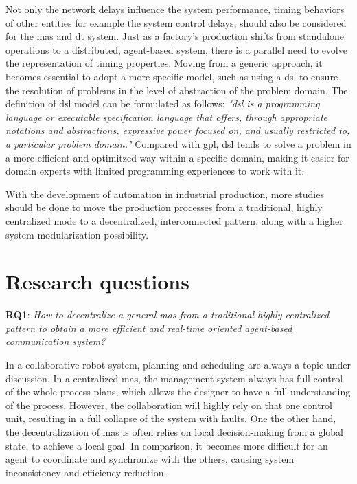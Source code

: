 Not only the network delays influence the system performance, timing behaviors of other 
entities for example the system control delays, should also be considered for the \gls{mas} and 
\gls{dt} system.
Just as a factory's production shifts from standalone operations to a distributed, 
agent-based system, there is a parallel need to evolve the representation of timing 
properties. Moving from a generic approach, it becomes essential to adopt a more 
specific model, such as using a \gls{dsl} to ensure the resolution of problems 
in the level of abstraction of the problem domain. The definition of \gls{dsl} model 
can be formulated as follows: \textit{"\gls{dsl} is a programming language or executable 
specification language
that offers, through appropriate notations and abstractions, expressive power focused 
on, and usually restricted to, a particular problem domain."}\cite{van_deursen_domain-specific_2000}
Compared with \gls{gpl}, \gls{dsl} tends to solve a problem in a more efficient 
and optimitzed way within a specific domain, making it easier for domain experts 
with limited programming experiences to work with it.  

With the development of automation in industrial production, more studies 
should be done to move the production processes from a traditional, highly 
centralized mode to a decentralized, interconnected pattern, along with 
a higher system modularization possibility. 









\section{Research questions}
\textbf{RQ1}: \textit{How to decentralize a general \gls{mas} from a traditional highly 
centralized pattern to obtain a more efficient and real-time oriented agent-based 
communication system?}

In a collaborative robot system, planning and scheduling are always a topic under 
discussion. In a centralized \gls{mas}, the management system always has full control 
of the whole process plans, which allows the designer to have a full understanding 
of the process. However, the collaboration will highly rely on that one control 
unit, resulting in a full collapse of the system with faults. One the other hand, 
the decentralization of \gls{mas} is often relies on local decision-making from 
a global state, to achieve a local goal. In comparison, it becomes more difficult for an agent to 
coordinate and synchronize with the others, causing system inconsistency and 
efficiency reduction\cite{xuan_multi-agent_nodate}\cite{sharma_comparative_2016}.




